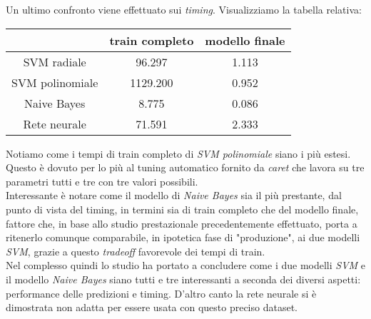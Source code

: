 Un ultimo confronto viene effettuato sui \textit{timing}. Visualizziamo la 
tabella relativa:
\begin{table}[H]
    \centering
    \begin{tabular}{c||c|c}
        & train completo & modello finale\\
        \hline
        \hline
        SVM radiale & 96.297 & 1.113 \\
        SVM polinomiale & 1129.200 & 0.952 \\
        Naive Bayes & 8.775 & 0.086 \\
        Rete neurale & 71.591 & 2.333 
    \end{tabular}
\end{table}
Notiamo come i tempi di train completo di \textit{SVM polinomiale} siano i più 
estesi. Questo è dovuto per lo più al tuning automatico fornito da 
\textit{caret} che lavora su tre parametri tutti e tre con tre valori 
possibili.\\
Interessante è notare come il modello di \textit{Naive Bayes} sia il più 
prestante, dal punto di vista del timing, in termini sia di train completo che 
del modello finale, fattore che,
in base allo studio prestazionale precedentemente effettuato, porta a ritenerlo 
comunque comparabile, in ipotetica fase di "produzione", ai due modelli 
\textit{SVM}, grazie a questo \textit{tradeoff} favorevole dei tempi di train.\\
Nel complesso quindi lo studio ha portato a concludere come i due modelli 
\textit{SVM} e il modello \textit{Naive Bayes} siano tutti e tre interessanti
a seconda dei diversi aspetti: performance delle predizioni e timing. D'altro
canto la rete neurale si è dimostrata non adatta per essere usata con questo
preciso dataset.